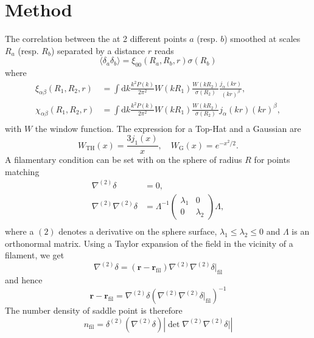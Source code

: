 \documentclass[useAMS,usenatbib,babel,superscriptaddress]{mnras}
\newcommand{\rr}{\mathbf{r}}
\newcommand{\mean}[1]{
  \langle #1
  \rangle}
\renewcommand{\d}{\mathrm{d}}             %
\newcommand{\dirac}[2]{\delta^{(#1)}\!\!\left(#2\right)}
\begin{document}
\section{Method}
\label{sec:method}

The correlation between the at 2 different points $a$ (resp. $b$) smoothed at scales $R_a$ (resp. $R_b$) separated by a distance $r$ reads
\begin{equation}
  \mean{\delta_a \delta_b} = \xi_{00}(R_a, R_b, r) \sigma(R_b)
\end{equation}
where
\begin{align}
  \xi_{\alpha\beta}(R_1, R_2, r) &= \int\d k \frac{k^2P(k)}{2\pi^2}W(kR_1)\frac{W(kR_2)}{\sigma(R_2)}\frac{j_\alpha(kr)}{(kr)^\beta},\\
  \chi_{\alpha\beta}(R_1, R_2, r) &= \int\d k \frac{k^2P(k)}{2\pi^2}W(kR_1)\frac{W(kR_2)}{\sigma(R_2)}j_\alpha(kr)(kr)^\beta,\\
\end{align}
with $W$ the window function. The expression for a Top-Hat and a Gaussian are
\begin{equation}
  W_\text{TH}(x) = \frac{3j_1(x)}{x},\quad W_\text{G}(x) = e^{-x^2/2}.
\end{equation}
A filamentary condition can be set with on the sphere of radius $R$ for points matching
\begin{align}
  \nabla^{(2)} \delta & = 0,\\
  \nabla^{(2)}\nabla^{(2)}\delta
                      & = \Lambda^{-1}
                        \begin{pmatrix}
                          \lambda_1 & 0 \\ 0 & \lambda_2
                        \end{pmatrix}\Lambda, \\
\end{align}
where a ${(2)}$ denotes a derivative on the sphere surface, $\lambda_1 \leq \lambda_2 \leq 0$ and $\Lambda$ is an orthonormal matrix. Using a Taylor expansion of the field in the vicinity of a filament, we get
\begin{equation}
  \nabla^{(2)} \delta = (\rr - \rr_\text{fil})\nabla^{(2)}\nabla^{(2)}\delta|_\text{fil}
\end{equation}
and hence
\begin{equation}
  \rr-\rr_\text{fil} = \nabla^{(2)}\delta\left(\nabla^{(2)}\nabla^{(2)}\delta|_\text{fil}\right)^{-1}
\end{equation}
The number density of saddle point is therefore
\begin{equation}
  n_\text{fil} = \dirac{2}{\nabla^{(2)}\delta} \left|\det{\nabla^{(2)}\nabla^{(2)}\delta|}\right|
\end{equation}
\end{document}
